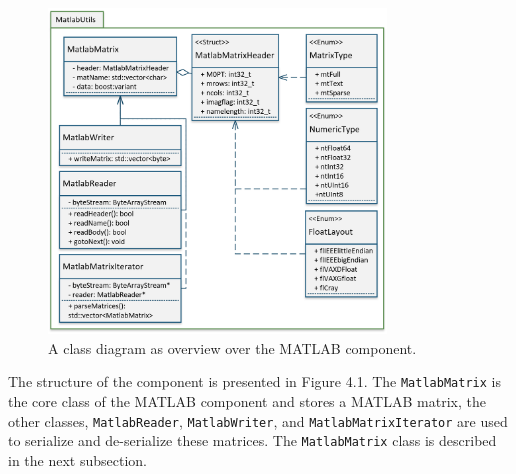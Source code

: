 \begin{figure}[ht]
\centering
      \includegraphics[width=0.8\textwidth]{mlab}
        \caption{A class diagram as overview over the MATLAB component.}
\end{figure}

The structure of the component is presented in Figure 4.1. The \texttt{MatlabMatrix} is the core class of the MATLAB component and stores a MATLAB matrix, the other classes, \texttt{MatlabReader}, \texttt{MatlabWriter}, and \texttt{MatlabMatrixIterator} are used to serialize and de-serialize these matrices. The \texttt{MatlabMatrix} class is described in the next subsection.
